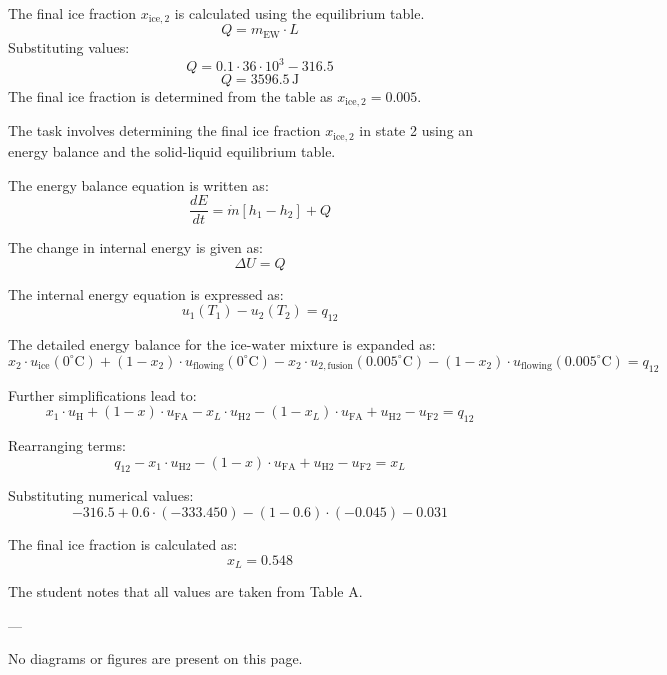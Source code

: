 The final ice fraction \( x_{\text{ice},2} \) is calculated using the equilibrium table.  
\[
Q = m_{\text{EW}} \cdot L
\]  
Substituting values:  
\[
Q = 0.1 \cdot 36 \cdot 10^3 - 316.5
\]  
\[
Q = 3596.5 \, \text{J}
\]  
The final ice fraction is determined from the table as \( x_{\text{ice},2} = 0.005 \).

The task involves determining the final ice fraction \( x_{\text{ice},2} \) in state 2 using an energy balance and the solid-liquid equilibrium table.

The energy balance equation is written as:  
\[
\frac{dE}{dt} = \dot{m} \left[ h_1 - h_2 \right] + Q
\]

The change in internal energy is given as:  
\[
\Delta U = Q
\]

The internal energy equation is expressed as:  
\[
u_1(T_1) - u_2(T_2) = q_{12}
\]

The detailed energy balance for the ice-water mixture is expanded as:  
\[
x_2 \cdot u_{\text{ice}}(0^\circ\text{C}) + (1 - x_2) \cdot u_{\text{flowing}}(0^\circ\text{C}) - x_2 \cdot u_{2,\text{fusion}}(0.005^\circ\text{C}) - (1 - x_2) \cdot u_{\text{flowing}}(0.005^\circ\text{C}) = q_{12}
\]

Further simplifications lead to:  
\[
x_1 \cdot u_{\text{H}} + (1 - x) \cdot u_{\text{FA}} - x_L \cdot u_{\text{H2}} - (1 - x_L) \cdot u_{\text{FA}} + u_{\text{H2}} - u_{\text{F2}} = q_{12}
\]

Rearranging terms:  
\[
q_{12} - x_1 \cdot u_{\text{H2}} - (1 - x) \cdot u_{\text{FA}} + u_{\text{H2}} - u_{\text{F2}} = x_L
\]

Substituting numerical values:  
\[
-316.5 + 0.6 \cdot (-333.450) - (1 - 0.6) \cdot (-0.045) - 0.031
\]

The final ice fraction is calculated as:  
\[
x_L = 0.548
\]

The student notes that all values are taken from Table A.

---

No diagrams or figures are present on this page.